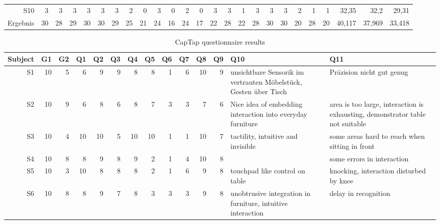 \begin{landscape}
\begin{table}[htbp]
\begin{tabular}{rrrrrrrrrrrrrrrrrrrrrrrrr}
    S10   & 3     & 3     & 3     & 3     & 3     & 3     & 2     & 0     & 3     & 0     & 2     & 0     & 3     & 3     & 1     & 3     & 3     & 3     & 2     & 1     & 1     & 32,35 & 32,2  & 29,31 \\
    Ergebnis & 30    & 28    & 29    & 30    & 30    & 29    & 25    & 21    & 24    & 16    & 24    & 17    & 22    & 28    & 22    & 28    & 30    & 30    & 20    & 28    & 20    & 40,117 & 37,969 & 33,418 \\
    \bottomrule
    \end{tabular}%
  \label{tab:app_eval_captap_raw_quant}%
\end{table}%
\end{landscape}
\begin{landscape}
\begin{table}[htbp]
  \footnotesize
  \centering
  \caption{CapTap questionnaire results}
    \begin{tabular}{rrrrrrrrrrrrm{4.5cm}m{4.5cm}}
    \toprule
    Subject & G1    & G2    & Q1    & Q2    & Q3    & Q4    & Q5    & Q6    & Q7    & Q8    & Q9    & Q10   & Q11 \\
    \midrule
    S1    & 10    & 5     & 6     & 9     & 9     & 8     & 8     & 1     & 6     & 10    & 9     & unsichtbare Sensorik im vertrauten Möbelstück, Gesten über Tisch & Präzision nicht gut genug \\
    S2    & 10    & 9     & 6     & 8     & 6     & 8     & 7     & 3     & 3     & 7     & 6     & Nice idea of embedding interaction into everyday furniture & area is too large, interaction is exhausting, demonstrator table not suitable \\
    S3    & 10    & 4     & 10    & 10    & 5     & 10    & 10    & 1     & 1     & 10    & 7     & tactility, intuitive and invisible & some areas hard to reach when sitting in front \\
    S4    & 10    & 8     & 8     & 9     & 8     & 9     & 2     & 1     & 4     & 10    & 8     &       & some errors in interaction \\
    S5    & 10    & 3     & 10    & 8     & 8     & 8     & 2     & 1     & 6     & 9     & 8     & touchpad like control on table & knocking, interaction disturbed by knee \\
    S6    & 10    & 8     & 8     & 9     & 7     & 8     & 3     & 3     & 3     & 9     & 8     & unobtrusive integration in furniture, intuitive interaction & delay in recognition \\

\end{tabular}
\end{table}
\end{landscape}
